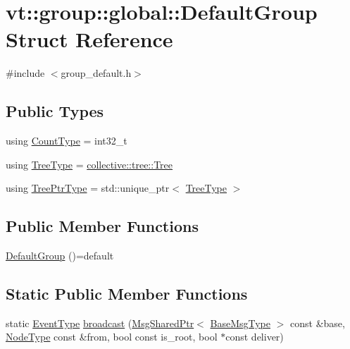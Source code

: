 \hypertarget{structvt_1_1group_1_1global_1_1_default_group}{}\section{vt\+:\+:group\+:\+:global\+:\+:Default\+Group Struct Reference}
\label{structvt_1_1group_1_1global_1_1_default_group}


{\ttfamily \#include $<$group\+\_\+default.\+h$>$}

\subsection*{Public Types}
\begin{DoxyCompactItemize}
\item 
using \hyperlink{structvt_1_1group_1_1global_1_1_default_group_a838e3ed0bd877d6ff703705c00c66e95}{Count\+Type} = int32\+\_\+t
\item 
using \hyperlink{structvt_1_1group_1_1global_1_1_default_group_a86d7ec049ad79c17fcb6b428534d0c1c}{Tree\+Type} = \hyperlink{structvt_1_1collective_1_1tree_1_1_tree}{collective\+::tree\+::\+Tree}
\item 
using \hyperlink{structvt_1_1group_1_1global_1_1_default_group_ab4b43c814196cd22463cfa0caad333d6}{Tree\+Ptr\+Type} = std\+::unique\+\_\+ptr$<$ \hyperlink{structvt_1_1group_1_1global_1_1_default_group_a86d7ec049ad79c17fcb6b428534d0c1c}{Tree\+Type} $>$
\end{DoxyCompactItemize}
\subsection*{Public Member Functions}
\begin{DoxyCompactItemize}
\item 
\hyperlink{structvt_1_1group_1_1global_1_1_default_group_ab21200c02abd2a011352bee173951942}{Default\+Group} ()=default
\end{DoxyCompactItemize}
\subsection*{Static Public Member Functions}
\begin{DoxyCompactItemize}
\item 
static \hyperlink{namespacevt_a009267401def7ae8bf201892222d060f}{Event\+Type} \hyperlink{structvt_1_1group_1_1global_1_1_default_group_aabe308609533b1a788516f4ff984be18}{broadcast} (\hyperlink{namespacevt_ab2b3d506ec8e8d1540aede826d84a239}{Msg\+Shared\+Ptr}$<$ \hyperlink{namespacevt_a44d0d4e144748f2b19a1cfd962f50338}{Base\+Msg\+Type} $>$ const \&base, \hyperlink{namespacevt_a866da9d0efc19c0a1ce79e9e492f47e2}{Node\+Type} const \&from, bool const is\+\_\+root, bool $\ast$const deliver)
\end{DoxyCompactItemize}
